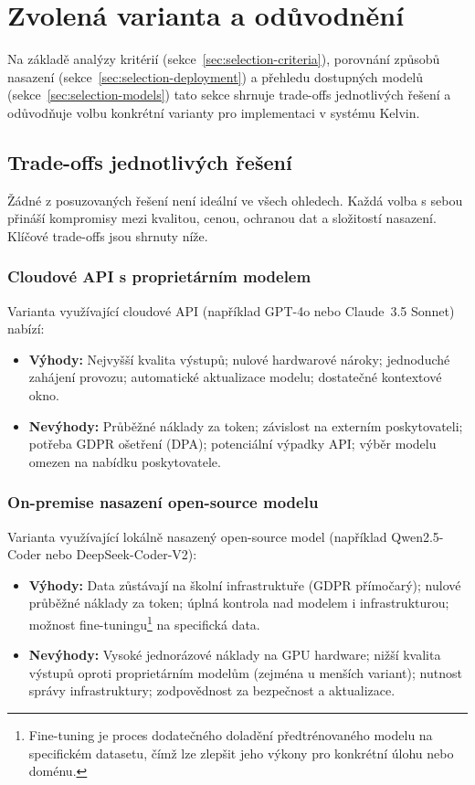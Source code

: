 \section{Zvolená varianta a odůvodnění}
\label{sec:selection-choice}

Na základě analýzy kritérií (sekce~\ref{sec:selection-criteria}), porovnání způsobů nasazení (sekce~\ref{sec:selection-deployment}) a přehledu dostupných modelů (sekce~\ref{sec:selection-models}) tato sekce shrnuje trade-offs jednotlivých řešení a odůvodňuje volbu konkrétní varianty pro implementaci v systému Kelvin.

\subsection{Trade-offs jednotlivých řešení}
\label{subsec:choice-tradeoffs}

Žádné z posuzovaných řešení není ideální ve všech ohledech.
Každá volba s sebou přináší kompromisy mezi kvalitou, cenou, ochranou dat a složitostí nasazení.
Klíčové trade-offs jsou shrnuty níže.

\subsubsection*{Cloudové API s proprietárním modelem}

Varianta využívající cloudové API (například GPT-4o nebo Claude~3.5 Sonnet) nabízí:
\begin{itemize}
    \item \textbf{Výhody:} Nejvyšší kvalita výstupů; nulové hardwarové nároky; jednoduché zahájení provozu; automatické aktualizace modelu; dostatečné kontextové okno.
    \item \textbf{Nevýhody:} Průběžné náklady za token; závislost na externím poskytovateli; potřeba GDPR ošetření (DPA); potenciální výpadky API; výběr modelu omezen na nabídku poskytovatele.
\end{itemize}

\subsubsection*{On-premise nasazení open-source modelu}

Varianta využívající lokálně nasazený open-source model (například Qwen2.5-Coder nebo DeepSeek-Coder-V2):
\begin{itemize}
    \item \textbf{Výhody:} Data zůstávají na školní infrastruktuře (GDPR přímočarý); nulové průběžné náklady za token; úplná kontrola nad modelem i infrastrukturou; možnost fine-tuningu\footnote{Fine-tuning je proces dodatečného doladění předtrénovaného modelu na specifickém datasetu, čímž lze zlepšit jeho výkony pro konkrétní úlohu nebo doménu.} na specifická data.
    \item \textbf{Nevýhody:} Vysoké jednorázové náklady na GPU hardware; nižší kvalita výstupů oproti proprietárním modelům (zejména u menších variant); nutnost správy infrastruktury; zodpovědnost za bezpečnost a aktualizace.
\end{itemize}

